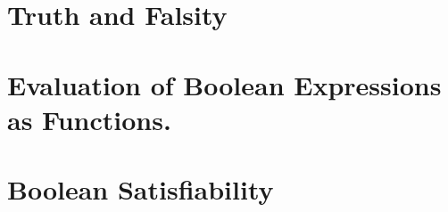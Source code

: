 


\section{Truth and Falsity}


\section{Evaluation of Boolean Expressions as Functions.}


\section{Boolean Satisfiability}
